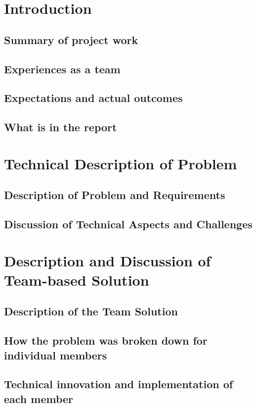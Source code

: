 \documentclass[a4paper]{report}
\begin{document}


\tableofcontents

\chapter{Introduction} 
\section{Summary of project work}
\section{Experiences as a team}
\section{Expectations and actual outcomes}
\section{What is in the report}

\chapter{Technical Description of Problem} 
\section{Description of Problem and Requirements}
\section{Discussion of Technical Aspects and Challenges}

\chapter{Description and Discussion of Team-based Solution} 
\section{Description of the Team Solution}
\section{How the problem was broken down for individual members}
\section{Technical innovation and implementation of each member}
\end{document}
